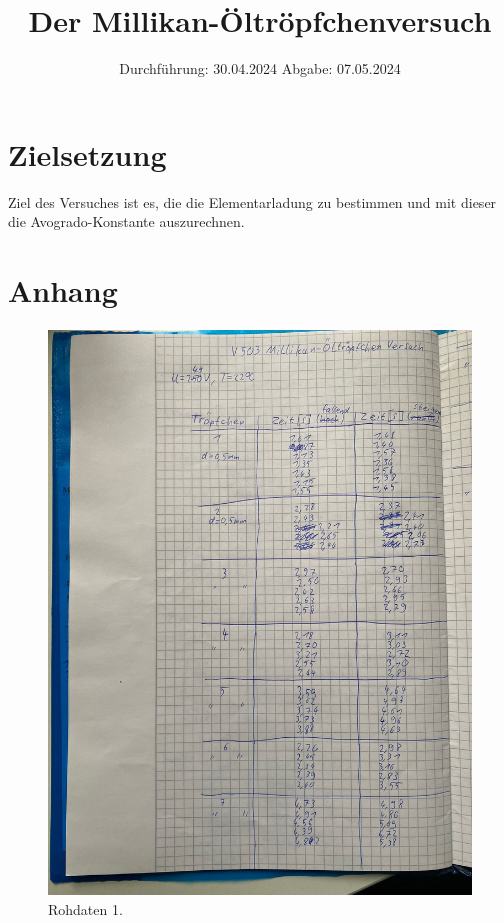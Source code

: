 

\subject{V503}
\title{Der Millikan-Öltröpfchenversuch}
\date{%
  Durchführung: 30.04.2024
  \hspace{3em}
  Abgabe: 07.05.2024
}



\maketitle
\thispagestyle{empty}
\tableofcontents
\newpage

\section{Zielsetzung}
Ziel des Versuches ist es, die die Elementarladung zu bestimmen und mit dieser die Avogrado-Konstante auszurechnen.






\printbibliography{}

\section{Anhang}
\begin{figure}[H]
  \includegraphics[width=\textwidth, height=15cm]{Bilder/rohdaten1.jpg}
  \caption{Rohdaten 1.}
\end{figure}


